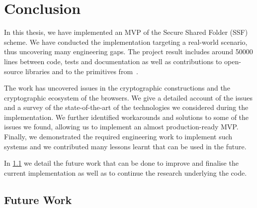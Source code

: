 \chapter{Conclusion}\label{ch:conclusion}

In this thesis, we have implemented an MVP of the
Secure Shared Folder (SSF) scheme. We have conducted
the implementation targeting a real-world scenario,
thus uncovering many engineering gaps.
The project result includes around 50000 lines
between code, tests and documentation as well as
contributions to open-source libraries and to the
primitives from~\cite{GKP}.

The work has uncovered issues in the cryptographic constructions
and the cryptographic ecosystem of the browsers.
We give a detailed account of the issues and a survey
of the state-of-the-art of the technologies
we considered during the implementation.
We further identified workarounds and solutions
to some of the issues we found, 
allowing us to implement an almost production-ready MVP.
Finally, we demonstrated the required engineering work 
to implement such systems and we contributed many lessons learnt
that can be used in the future.


In \cref{sc:future-work} we detail
the future work that can be done to improve and finalise
the current implementation as well as to continue 
the research underlying the code.


\section{Future Work}\label{sc:future-work}

